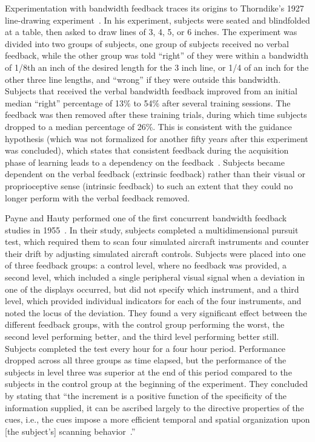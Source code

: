 \documentclass[float=false, crop=false]{standalone}
\begin{document}
Experimentation with bandwidth feedback traces its origins to Thorndike's 1927 line-drawing experiment~\cite{thorndike1927law}.
In his experiment, subjects were seated and blindfolded at a table, then asked to draw lines of 3, 4, 5, or 6 inches.
The experiment was divided into two groups of subjects, one group of subjects received no verbal feedback, while the other group was told ``right'' of they were within a bandwidth of 1/8th an inch of the desired length for the 3 inch line, or 1/4 of an inch for the other three line lengths, and ``wrong'' if they were outside this bandwidth.
Subjects that received the verbal bandwidth feedback improved from an initial median ``right'' percentage of 13\% to 54\% after several training sessions.
The feedback was then removed after these training trials, during which time subjects dropped to a median percentage of 26\%.
This is consistent with the guidance hypothesis (which was not formalized for another fifty years after this experiment was concluded), which states that consistent feedback during the acquisition phase of learning leads to a dependency on the feedback~\cite{salmoni1984knowledge}.
Subjects became dependent on the verbal feedback (extrinsic feedback) rather than their visual or proprioceptive sense (intrinsic feedback) to such an extent that they could no longer perform with the verbal feedback removed.

Payne and Hauty performed one of the first concurrent bandwidth feedback studies in 1955~\cite{payne1955effect}.
In their study, subjects completed a multidimensional pursuit test, which required them to scan four simulated aircraft instruments and counter their drift by adjusting simulated aircraft controls.
Subjects were placed into one of three feedback groups: a control level, where no feedback was provided, a second level, which included a single peripheral visual signal when a deviation in one of the displays occurred, but did not specify which instrument, and a third level, which provided individual indicators for each of the four instruments, and noted the locus of the deviation.
They found a very significant effect between the different feedback groups, with the control group performing the worst, the second level performing better, and the third level performing better still.
Subjects completed the test every hour for a four hour period.
Performance dropped across all three groups as time elapsed, but the performance of the subjects in level three was superior at the end of this period compared to the subjects in the control group at the beginning of the experiment.
They concluded by stating that ``the increment is a positive function of the specificity of the information supplied, it can be ascribed largely to the directive properties of the cues, i.e., the cues impose a more efficient temporal and spatial organization upon [the subject's] scanning behavior~\cite{payne1955effect}.''
\end{document}

